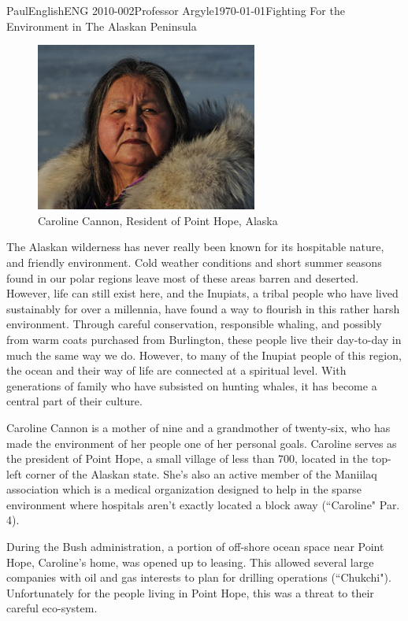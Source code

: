 \documentclass[12pt,letterpaper]{article}
\begin{document}
\begin{mla}{Paul}{English}{ENG 2010-002}{Professor Argyle}{\today}{Fighting For the Environment in The Alaskan Peninsula}

\begin{figure}
  \begin{center}
    \includegraphics[scale=0.5]{2012_nam_cannon.jpeg}
  \end{center}
  \caption{Caroline Cannon, Resident of Point Hope, Alaska}
\end{figure}

The Alaskan wilderness has never really been known for its hospitable nature, and friendly environment. Cold weather conditions and short summer seasons found in our polar regions leave most of these areas barren and deserted. However, life can still exist here, and the Inupiats, a tribal people who have lived sustainably for over a millennia, have found a way to flourish in this rather harsh environment. Through careful conservation, responsible whaling, and possibly from warm coats purchased from Burlington, these people live their day-to-day in much the same way we do. However, to many of the Inupiat people of this region, the ocean and their way of life are connected at a spiritual level. With generations of family who have subsisted on hunting whales, it has become a central part of their culture.

Caroline Cannon is a mother of nine and a grandmother of twenty-six, who has made the environment of her people one of her personal goals. Caroline serves as the president of Point Hope, a small village of less than 700, located in the top-left corner of the Alaskan state. She's also an active member of the Maniilaq association which is a medical organization designed to help in the sparse environment where hospitals aren't exactly located a block away (``Caroline" Par. 4).

During the Bush administration, a portion of off-shore ocean space near Point Hope, Caroline's home, was opened up to leasing. This allowed several large companies with oil and gas interests to plan for drilling operations (``Chukchi"). Unfortunately for the people living in Point Hope, this was a threat to their careful eco-system.


\end{mla}
\end{document}
